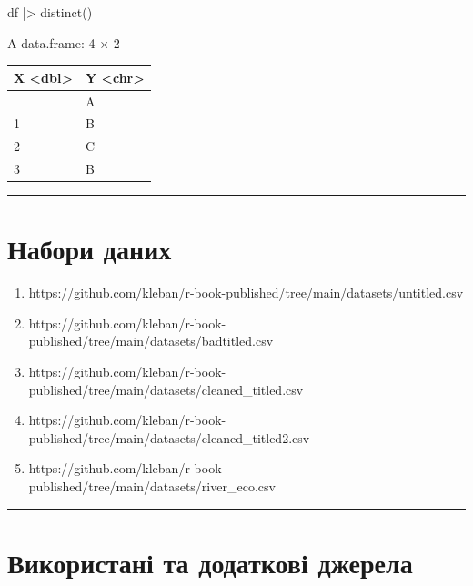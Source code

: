 \documentclass[
  letterpaper,
  DIV=11,
  numbers=noendperiod]{scrreprt}
\newenvironment{Shaded}{\begin{snugshade}}{\end{snugshade}}
\newcommand{\FunctionTok}[1]{\textcolor[rgb]{0.28,0.35,0.67}{#1}}
\newcommand{\NormalTok}[1]{\textcolor[rgb]{0.00,0.23,0.31}{#1}}
\newcommand{\SpecialCharTok}[1]{\textcolor[rgb]{0.37,0.37,0.37}{#1}}
\providecommand{\tightlist}{%
  \setlength{\itemsep}{0pt}\setlength{\parskip}{0pt}}\usepackage{longtable,booktabs,array}
\begin{document}
\begin{Shaded}
\begin{Highlighting}[]
\NormalTok{df }\SpecialCharTok{|\textgreater{}} \FunctionTok{distinct}\NormalTok{()}
\end{Highlighting}
\end{Shaded}

A data.frame: 4 × 2

\begin{longtable}[]{@{}ll@{}}
\toprule\noalign{}
X \textless dbl\textgreater{} & Y \textless chr\textgreater{} \\
\midrule\noalign{}
\endhead
\bottomrule\noalign{}
\endlastfoot
1 & A \\
1 & B \\
2 & C \\
3 & B \\
\end{longtable}

\begin{center}\rule{0.5\linewidth}{0.5pt}\end{center}

\section{Набори
даних}\label{ux43dux430ux431ux43eux440ux438-ux434ux430ux43dux438ux445-11}

\begin{enumerate}
\def\labelenumi{\arabic{enumi}.}
\tightlist
\item
  https://github.com/kleban/r-book-published/tree/main/datasets/untitled.csv
\item
  https://github.com/kleban/r-book-published/tree/main/datasets/badtitled.csv
\item
  https://github.com/kleban/r-book-published/tree/main/datasets/cleaned\_titled.csv
\item
  https://github.com/kleban/r-book-published/tree/main/datasets/cleaned\_titled2.csv
\item
  https://github.com/kleban/r-book-published/tree/main/datasets/river\_eco.csv
\end{enumerate}

\begin{center}\rule{0.5\linewidth}{0.5pt}\end{center}

\section{Використані та додаткові
джерела}\label{ux432ux438ux43aux43eux440ux438ux441ux442ux430ux43dux456-ux442ux430-ux434ux43eux434ux430ux442ux43aux43eux432ux456-ux434ux436ux435ux440ux435ux43bux430-4}
\end{document}
